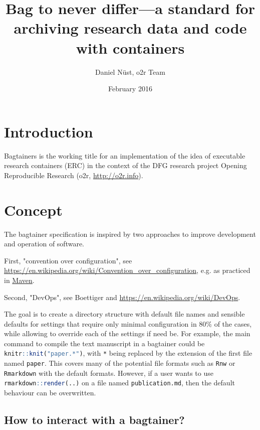 \documentclass[twoside,a4paper]{refart}
\title{Bag to never differ---a standard for archiving research data and code with containers}
\author{Daniel Nüst, o2r Team}
\date{February 2016\\ \versionnumber}
\def\inliner{\lstinline[basicstyle=\ttfamily,language=R,keywordstyle={}]} % http://tex.stackexchange.com/questions/44702/can-you-change-lstinline-without-changing-the-global-lstset
\begin{document}
\maketitle


\section{Introduction}

Bagtainers is the working title for an implementation of the idea of executable research containers (ERC) in the context of the DFG research project Opening Reproducible Research (o2r, \url{http://o2r.info}).


\section{Concept}

The bagtainer specification is inspired by two approaches to improve development and operation of software.

First, "convention over configuration", see \url{https://en.wikipedia.org/wiki/Convention_over_configuration}, e.g. as practiced in \href{https://books.sonatype.com/mvnref-book/reference/installation-sect-conventionConfiguration.html}{Maven}.

Second, "DevOps", see Boettiger and \url{https://en.wikipedia.org/wiki/DevOps}.

The goal is to create a directory structure with default file names and sensible defaults for settings that require only minimal configuration in 80\% of the cases, while allowing to override each of the settings if need be.
For example, the main command to compile the text manuscript in a bagtainer could be \inliner{knitr::knit("paper.*")}, with \texttt{*} being replaced by the extension of the first file named \texttt{paper}. This covers many of the potential file formats such as \texttt{Rnw} or \texttt{Rmarkdown} with the default formats. However, if a user wants to use \inliner{rmarkdown::render(..)} on a file named \texttt{publication.md}, then the default behaviour can be overwritten.

\subsection{How to interact with a bagtainer?}
\end{document}
